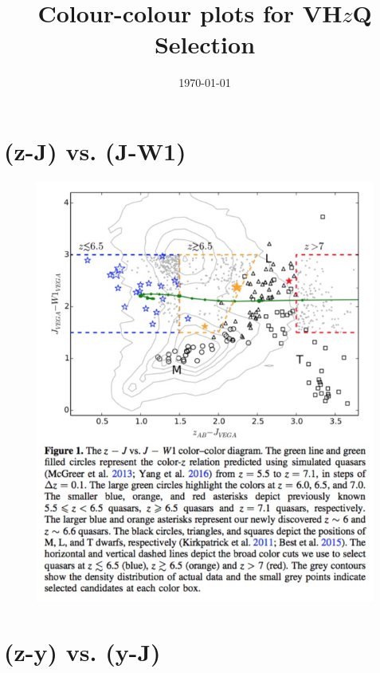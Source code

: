 \documentclass[11pt,a4paper]{article}
\begin{document}
   \title{Colour-colour plots for VH$z$Q Selection}
 \date{\today}
\maketitle

\section{(z-J) vs. (J-W1)}
    \begin{figure}
      \centering
      \includegraphics[width=16.0cm, trim={0.5cm 0 0 0},clip]
      {Wang2017_Fig1.jpeg}
      \caption[]{\citet{Wang2017}}
      \label{fig:Wang2017}
    \end{figure}


\section{(z-y) vs. (y-J)}
\end{document}

